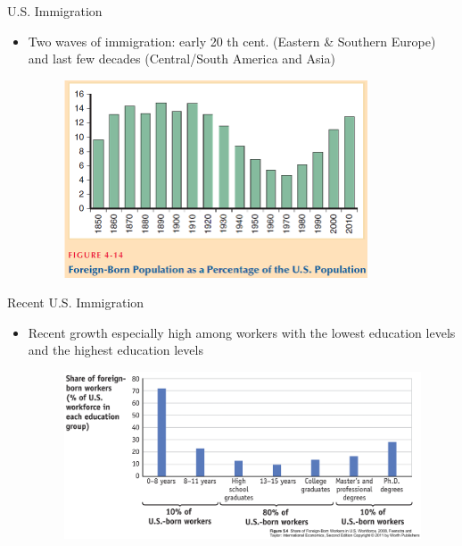 \documentclass[10pt,hyperref={CJKbookmarks=true},xcolor=dvipsnames,aspectratio=169]{beamer}
\begin{document}
\begin{frame}{U.S. Immigration }

\begin{itemize}
\item Two waves of immigration: early 20 th cent. (Eastern \& Southern Europe)
and last few decades (Central/South America and Asia) 
\begin{figure}


\begin{centering}
\includegraphics[width=9cm]{fig/migration/lec4-32}
\par\end{centering}

\end{figure}

\end{itemize}
\end{frame}

\begin{frame}{Recent U.S. Immigration }

\begin{itemize}
\item Recent growth especially high among workers with the lowest education
levels and the highest education levels
\begin{figure}


\begin{centering}
\includegraphics[width=11cm]{fig/migration/lec4-33}
\par\end{centering}

\end{figure}

\end{itemize}
\end{frame}
\end{document}
